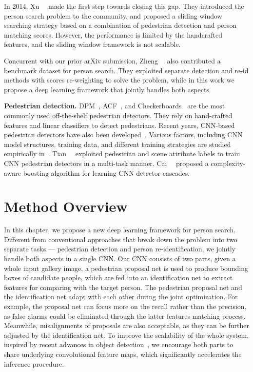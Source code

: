 In 2014, Xu~\etal~\cite{xu2014person} made the first step towards closing this gap. They introduced the person search problem to the community, and proposed a sliding window searching strategy based on a combination of pedestrian detection and person matching scores. However, the performance is limited by the handcrafted features, and the sliding window framework is not scalable.

Concurrent with our prior arXiv submission, Zheng~\etal~\cite{zheng2017person} also contributed a benchmark dataset for person search. They exploited separate detection and re-id methods with scores re-weighting to solve the problem, while in this work we propose a deep learning framework that jointly handles both aspects.

\textbf{Pedestrian detection.} DPM~\cite{felzenszwalb2010object}, ACF~\cite{dollar2014fast}, and Checkerboards~\cite{zhang2015filtered} are the most commonly used off-the-shelf pedestrian detectors. They rely on hand-crafted features and linear classifiers to detect pedestrians. Recent years, CNN-based pedestrian detectors have also been developed~\cite{yang2015convolutional,zhang2016faster}. Various factors, including CNN model structures, training data, and different training strategies are studied empirically in~\cite{hosang2015taking}. Tian~\etal~\cite{tian2015pedestrian} exploited pedestrian and scene attribute labels to train CNN pedestrian detectors in a multi-task manner. Cai~\etal~\cite{cai2015learning} proposed a complexity-aware boosting algorithm for learning CNN detector cascades.


\section{Method Overview} %
\label{sec:ps-overview}
In this chapter, we propose a new deep learning framework for person search. Different from conventional approaches that break down the problem into two separate tasks --- pedestrian detection and person re-identification, we jointly handle both aspects in a single CNN. Our CNN consists of two parts, given a whole input gallery image, a pedestrian proposal net is used to produce bounding boxes of candidate people, which are fed into an identification net to extract features for comparing with the target person. The pedestrian proposal net and the identification net adapt with each other during the joint optimization. For example, the proposal net can focus more on the recall rather than the precision, as false alarms could be eliminated through the latter features matching process. Meanwhile, misalignments of proposals are also acceptable, as they can be further adjusted by the identification net. To improve the scalability of the whole system, inspired by recent advances in object detection~\cite{ren2015faster}, we encourage both parts to share underlying convolutional feature maps, which significantly accelerates the inference procedure.

